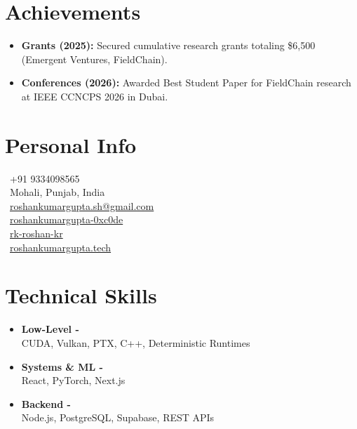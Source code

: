 \documentclass[9pt,a4paper]{extarticle}
\begin{document}
\begin{minipage}[t]{0.63\textwidth}
\section{Achievements}
\begin{itemize}[leftmargin=12pt, itemsep=1pt, parsep=0pt]
    \item \textbf{Grants (2025):} Secured cumulative research grants totaling \$6,500 (Emergent Ventures, FieldChain).
    \item \textbf{Conferences (2026):} Awarded Best Student Paper for FieldChain research at IEEE CCNCPS 2026 in Dubai.
\end{itemize}

\end{minipage}%
\hfill
\setlength{\fboxsep}{3mm}
\colorbox{sidebarbg}{%
\begin{minipage}[t]{\dimexpr0.34\textwidth-2\fboxsep\relax}
\vspace*{0pt} %

\section{Personal Info}
\faPhone \ +91 9334098565 \\
\faMapMarker \ Mohali, Punjab, India \\
\faEnvelope \ \href{mailto:roshankumargupta.sh@gmail.com}{roshankumargupta.sh@gmail.com} \\
\faLinkedin \ \href{https://linkedin.com/in/roshankumargupta-0xc0de}{roshankumargupta-0xc0de} \\
\faGithub \ \href{https://github.com/rk-roshan-kr}{rk-roshan-kr} \\
\faGlobe \ \href{https://roshankumargupta.tech}{roshankumargupta.tech}

\section{Technical Skills}
\begin{itemize}[leftmargin=12pt, itemsep=1pt, parsep=0pt]
    \item \textbf{Low-Level -} \\ CUDA, Vulkan, PTX, C++, Deterministic Runtimes
    \item \textbf{Systems \& ML -} \\ React, PyTorch, Next.js
    \item \textbf{Backend -} \\ Node.js, PostgreSQL, Supabase, REST APIs
\end{itemize}


\end{minipage}}
\end{document}
